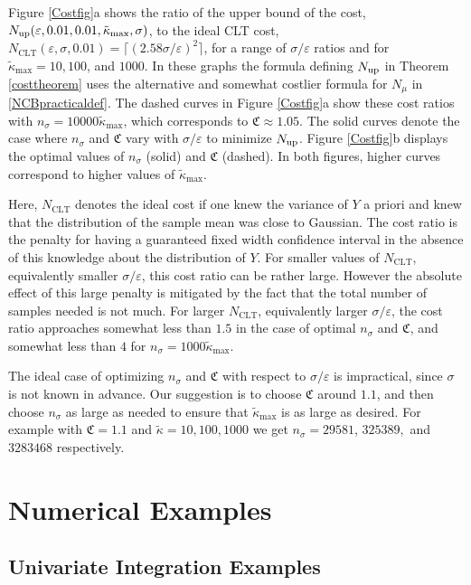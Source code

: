 \documentclass[graybox]{svmult}
\newcommand{\fudge}{\mathfrak{C}}
\newcommand{\tkappa}{\tilde{\kappa}}
\begin{document}
Figure \ref{Costfig}a shows the ratio of the upper bound of the cost, $N_{\rm{up}}(\varepsilon,0.01,0.01, \tkappa_{\max}, \sigma)$, to the ideal CLT cost, $N_{\mathrm{CLT}}(\varepsilon,\sigma,0.01)=\lceil (2.58\sigma/\varepsilon)^2\rceil$, for a range of $\sigma/\varepsilon$ ratios and for $\tkappa_{\max}=10,100$, and $1000$. In these graphs the formula defining $N_{\rm{up}}$ in Theorem \ref{costtheorem} uses the alternative and somewhat costlier formula for $N_{\mu}$ in \eqref{NCBpracticaldef}. The dashed curves in Figure \ref{Costfig}a show these cost ratios with $n_\sigma=10000\tkappa_{\max}$, which corresponds to $\fudge \approx 1.05$.  The solid curves denote the case where $n_\sigma$ and $\fudge$ vary with $\sigma/\varepsilon$ to minimize $N_{\rm{up}}$.  Figure \ref{Costfig}b displays the optimal values of $n_\sigma$ (solid) and $\fudge$ (dashed).  In both figures, higher curves correspond to higher values of $\tkappa_{\max}$. 

Here, $N_{\mathrm{CLT}}$ denotes the ideal cost if one knew the variance of $Y$ a priori and knew that the distribution of the sample mean was close to Gaussian. The cost ratio is the penalty for having a guaranteed fixed width confidence interval in the absence of this knowledge about the distribution of $Y$.  For smaller values of $N_{\mathrm{CLT}}$, equivalently smaller  $\sigma/\varepsilon$, this cost ratio can be rather large.  However the absolute effect of this large penalty is mitigated by the fact that the total number of samples needed is not much.  For larger $N_{\mathrm{CLT}}$, equivalently larger  $\sigma/\varepsilon$, the cost ratio approaches somewhat less than $1.5$ in the case of optimal $n_\sigma$ and $\fudge$, and somewhat less than $4$ for $n_\sigma=1000\tkappa_{\max}$.

The ideal case of optimizing $n_\sigma$ and $\fudge$ with respect to $\sigma/\varepsilon$ is impractical, since $\sigma$ is not known in advance.  Our suggestion is to choose $\fudge$ around $1.1$, and then choose $n_\sigma$ as large as needed to ensure that $\tkappa_{\max}$ is as large as desired. For example with  $\fudge = 1.1$ and 
$\tilde \kappa = 10, 100, 1000$
we get $n_\sigma = 29581$, $325389,$ and $3283468$ respectively.

\section{Numerical Examples} \label{numerexsec}

\subsection{Univariate Integration Examples}
\end{document}
